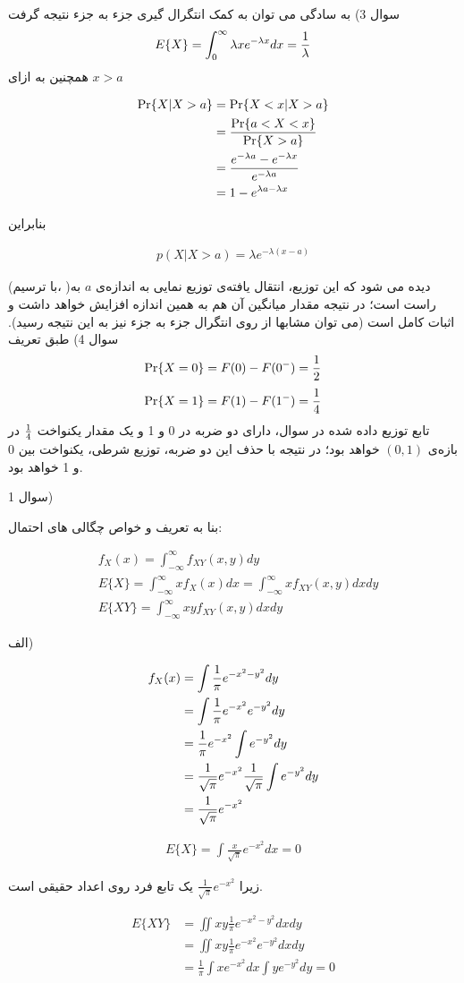 \documentclass[10pt,letterpaper]{report}
\newcommand{\eqn}[1]{
\[\begin{split}
#1
\end{split}\]
}
\begin{document}
سوال 3) به سادگی می توان به کمک انتگرال گیری جزء به جزء نتیجه گرفت
$$
E\{X\}=\int_0^\infty \lambda x e^{-\lambda x}dx={1\over \lambda}
$$
همچنین به ازای $x>a$
\eqn{
\Pr\{X|X>a\}&=\Pr\{X<x|X>a\}
\\&={\Pr\{a<X<x\}\over \Pr\{X>a\}}
\\&={e^{-\lambda a}-e^{-\lambda x}\over e^{-\lambda a}}
\\&={1-e^{\lambda a-\lambda x}}
}
بنابراین
\eqn{
p(X|X>a)=\lambda e^{-\lambda (x-a)}
}
(با ترسیم، )دیده می شود که این توزیع، انتقال یافته‌ی توزیع نمایی به اندازه‌ی $a$ به راست است؛ در نتیجه مقدار میانگین آن هم به همین اندازه افزایش خواهد داشت و اثبات کامل است (می توان مشابها از روی انتگرال جزء به جزء نیز به این نتیجه رسید).
\newline\newline
سوال 4) طبق تعریف
$$
\Pr\{X=0\}=F(0)-F(0^-)={1\over 2}
$$
$$
\Pr\{X=1\}=F(1)-F(1^-)={1\over 4}
$$
تابع توزیع داده شده در سوال، دارای دو ضربه در 0 و 1 و یک مقدار یکنواخت $1\over 4$ در بازه‌ی $(0,1)$ خواهد بود؛ در نتیجه با حذف این دو ضربه، توزیع شرطی، یکنواخت بین 0 و 1 خواهد بود.

سوال 1)

بنا به تعریف و خواص چگالی های احتمال:
\eqn{
&f_X(x)=\int_{-\infty}^\infty f_{XY}(x,y)dy
\\&E\{X\}=\int_{-\infty}^\infty xf_{X}(x)dx=\int_{-\infty}^\infty xf_{XY}(x,y)dxdy
\\&E\{XY\}=\int_{-\infty}^\infty xyf_{XY}(x,y)dxdy
}

الف) 
\eqn{
f_X(x)&=\int \frac{1}{\pi}e^{-x^2-y^2}dy
\\&=\int \frac{1}{\pi}e^{-x^2}e^{-y^2}dy
\\&=\frac{1}{\pi}e^{-x^2}\int e^{-y^2}dy
\\&=\frac{1}{\sqrt\pi}e^{-x^2}{1\over \sqrt \pi}\int e^{-y^2}dy
\\&=\frac{1}{\sqrt\pi}e^{-x^2}
}

\eqn{
E\{X\}=\int \frac{x}{\sqrt\pi}e^{-x^2} dx=0
}
زیرا $\frac{1}{\sqrt\pi}e^{-x^2}$ یک تابع فرد روی اعداد حقیقی است.

\eqn{
E\{XY\}&=\iint xy\frac{1}{\pi}e^{-x^2-y^2}dxdy
\\&=\iint xy\frac{1}{\pi}e^{-x^2}e^{-y^2}dxdy
\\&=\frac{1}{\pi}\int xe^{-x^2}dx\int ye^{-y^2}dy=0
}
\end{document}
